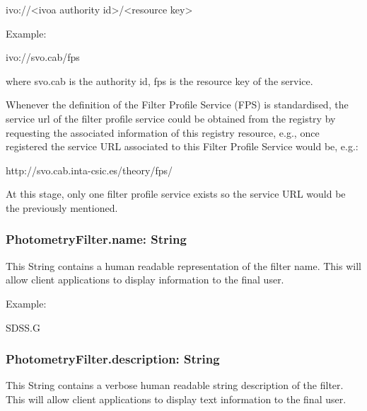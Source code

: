 \documentclass[11pt,a4paper]{ivoa}
\begin{document}
ivo://<ivoa authority id>/<resource key>
\bigskip


Example:
\par

ivo://svo.cab/fps
\bigskip




where svo.cab is the authority id, fps is the resource key of the service.
\par

Whenever the definition of the Filter Profile Service (FPS) is standardised,
the service url of the filter profile service could be obtained
from the registry by requesting the associated information of this
registry resource, e.g., once registered the service URL associated
to this Filter Profile Service would be, e.g.:
\par

http://svo.cab.inta-csic.es/theory/fps/
\bigskip

At this stage, only one filter profile service exists so the service
URL would be the previously mentioned.

\subsubsection{PhotometryFilter.name: String}
This String contains a human readable representation of the filter
name. This will allow client applications to display information
to the final user.
\par

Example:
\par

SDSS.G
\bigskip




\subsubsection{PhotometryFilter.description: String}
This String contains a verbose human readable string description of the
filter. This will allow client applications to display text information
to the final user.
\par
\end{document}
